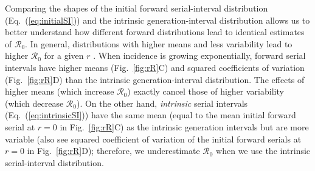 \documentclass[12pt]{article}
\newcommand{\eref}[1]{Eq.~(\ref{eq:#1})}
\newcommand{\fref}[1]{Fig.~\ref{fig:#1}}
\newcommand{\Rx}[1]{\ensuremath{{\mathcal R}_{#1}}\xspace}
\newcommand{\Ro}{\Rx{0}}
\begin{document}
Comparing the shapes of the initial forward serial-interval distribution (\eref{initialSI}) and the intrinsic generation-interval distribution allows us to better understand how different forward distributions lead to identical estimates of \Ro.
In general, distributions with higher means and less variability lead to higher \Ro for a given $r$ \citep{wallinga2007generation, weitz2015modeling, park2019practical}.
When incidence is growing exponentially, forward serial intervals have higher means (\fref{rR}C) and squared coefficients of variation (\fref{rR}D) than the intrinsic generation-interval distribution.
The effects of higher means (which increase \Ro) exactly cancel those of higher variability (which decrease \Ro).
On the other hand, \emph{intrinsic} serial intervals (\eref{intrinsicSI}) have the same mean (equal to the mean initial forward serial at $r=0$ in \fref{rR}C) as the intrinsic generation intervals but are more variable (also see squared coefficient of variation of the initial forward serials at $r=0$ in \fref{rR}D); 
therefore, we underestimate \Ro when we use the intrinsic serial-interval distribution.
\end{document}
